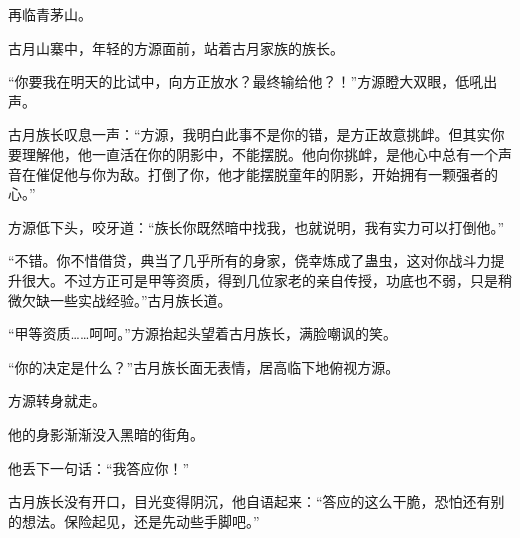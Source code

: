 \begin{this_body}
再临青茅山。

古月山寨中，年轻的方源面前，站着古月家族的族长。

“你要我在明天的比试中，向方正放水？最终输给他？！”方源瞪大双眼，低吼出声。

古月族长叹息一声：“方源，我明白此事不是你的错，是方正故意挑衅。但其实你要理解他，他一直活在你的阴影中，不能摆脱。他向你挑衅，是他心中总有一个声音在催促他与你为敌。打倒了你，他才能摆脱童年的阴影，开始拥有一颗强者的心。”

方源低下头，咬牙道：“族长你既然暗中找我，也就说明，我有实力可以打倒他。”

“不错。你不惜借贷，典当了几乎所有的身家，侥幸炼成了蛊虫，这对你战斗力提升很大。不过方正可是甲等资质，得到几位家老的亲自传授，功底也不弱，只是稍微欠缺一些实战经验。”古月族长道。

“甲等资质……呵呵。”方源抬起头望着古月族长，满脸嘲讽的笑。

“你的决定是什么？”古月族长面无表情，居高临下地俯视方源。

方源转身就走。

他的身影渐渐没入黑暗的街角。

他丢下一句话：“我答应你！”

古月族长没有开口，目光变得阴沉，他自语起来：“答应的这么干脆，恐怕还有别的想法。保险起见，还是先动些手脚吧。”

\end{this_body}

